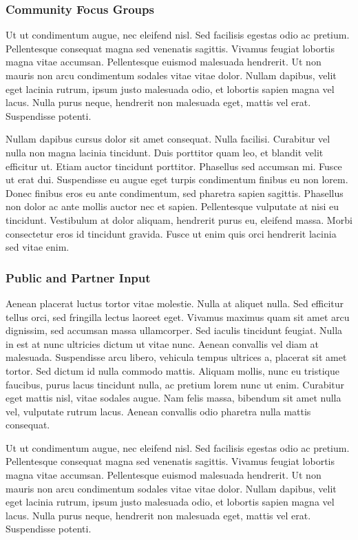 \documentclass[
  letterpaper,
  DIV=11,
  numbers=noendperiod]{scrreprt}
\begin{document}
\subsubsection{Community Focus Groups}\label{community-focus-groups}

Ut ut condimentum augue, nec eleifend nisl. Sed facilisis egestas odio
ac pretium. Pellentesque consequat magna sed venenatis sagittis. Vivamus
feugiat lobortis magna vitae accumsan. Pellentesque euismod malesuada
hendrerit. Ut non mauris non arcu condimentum sodales vitae vitae dolor.
Nullam dapibus, velit eget lacinia rutrum, ipsum justo malesuada odio,
et lobortis sapien magna vel lacus. Nulla purus neque, hendrerit non
malesuada eget, mattis vel erat. Suspendisse potenti.

Nullam dapibus cursus dolor sit amet consequat. Nulla facilisi.
Curabitur vel nulla non magna lacinia tincidunt. Duis porttitor quam
leo, et blandit velit efficitur ut. Etiam auctor tincidunt porttitor.
Phasellus sed accumsan mi. Fusce ut erat dui. Suspendisse eu augue eget
turpis condimentum finibus eu non lorem. Donec finibus eros eu ante
condimentum, sed pharetra sapien sagittis. Phasellus non dolor ac ante
mollis auctor nec et sapien. Pellentesque vulputate at nisi eu
tincidunt. Vestibulum at dolor aliquam, hendrerit purus eu, eleifend
massa. Morbi consectetur eros id tincidunt gravida. Fusce ut enim quis
orci hendrerit lacinia sed vitae enim.

\subsubsection{Public and Partner Input}\label{public-and-partner-input}

Aenean placerat luctus tortor vitae molestie. Nulla at aliquet nulla.
Sed efficitur tellus orci, sed fringilla lectus laoreet eget. Vivamus
maximus quam sit amet arcu dignissim, sed accumsan massa ullamcorper.
Sed iaculis tincidunt feugiat. Nulla in est at nunc ultricies dictum ut
vitae nunc. Aenean convallis vel diam at malesuada. Suspendisse arcu
libero, vehicula tempus ultrices a, placerat sit amet tortor. Sed dictum
id nulla commodo mattis. Aliquam mollis, nunc eu tristique faucibus,
purus lacus tincidunt nulla, ac pretium lorem nunc ut enim. Curabitur
eget mattis nisl, vitae sodales augue. Nam felis massa, bibendum sit
amet nulla vel, vulputate rutrum lacus. Aenean convallis odio pharetra
nulla mattis consequat.

Ut ut condimentum augue, nec eleifend nisl. Sed facilisis egestas odio
ac pretium. Pellentesque consequat magna sed venenatis sagittis. Vivamus
feugiat lobortis magna vitae accumsan. Pellentesque euismod malesuada
hendrerit. Ut non mauris non arcu condimentum sodales vitae vitae dolor.
Nullam dapibus, velit eget lacinia rutrum, ipsum justo malesuada odio,
et lobortis sapien magna vel lacus. Nulla purus neque, hendrerit non
malesuada eget, mattis vel erat. Suspendisse potenti.
\end{document}
